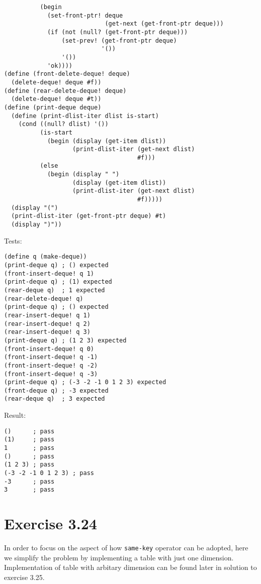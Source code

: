 \documentclass[../main.tex]{subfiles}
\begin{document}
\begin{lstlisting}
          (begin
            (set-front-ptr! deque
                            (get-next (get-front-ptr deque)))
            (if (not (null? (get-front-ptr deque)))
                (set-prev! (get-front-ptr deque)
                           '())
                '())
            'ok))))
(define (front-delete-deque! deque)
  (delete-deque! deque #f))
(define (rear-delete-deque! deque)
  (delete-deque! deque #t))
(define (print-deque deque)
  (define (print-dlist-iter dlist is-start)
    (cond ((null? dlist) '())
          (is-start
            (begin (display (get-item dlist))
                   (print-dlist-iter (get-next dlist)
                                     #f)))
          (else
            (begin (display " ")
                   (display (get-item dlist))
                   (print-dlist-iter (get-next dlist)
                                     #f)))))
  (display "(")
  (print-dlist-iter (get-front-ptr deque) #t)
  (display ")"))
\end{lstlisting}

Tests:

\begin{lstlisting}
(define q (make-deque))
(print-deque q) ; () expected
(front-insert-deque! q 1)
(print-deque q) ; (1) expected
(rear-deque q)  ; 1 expected
(rear-delete-deque! q)
(print-deque q) ; () expected
(rear-insert-deque! q 1)
(rear-insert-deque! q 2)
(rear-insert-deque! q 3)
(print-deque q) ; (1 2 3) expected
(front-insert-deque! q 0)
(front-insert-deque! q -1)
(front-insert-deque! q -2)
(front-insert-deque! q -3)
(print-deque q) ; (-3 -2 -1 0 1 2 3) expected
(front-deque q) ; -3 expected
(rear-deque q)  ; 3 expected
\end{lstlisting}

Result:

\begin{lstlisting}
()      ; pass
(1)     ; pass
1       ; pass
()      ; pass
(1 2 3) ; pass
(-3 -2 -1 0 1 2 3) ; pass
-3      ; pass
3       ; pass
\end{lstlisting}

\section{Exercise 3.24}

In order to focus on the aspect of how
 \lstinline{same-key} operator can be adopted,
 here we simplify the problem by implementing
 a table with just one dimension. Implementation
 of table with arbitary dimension can be found
 later in solution to exercise 3.25.
\end{document}
